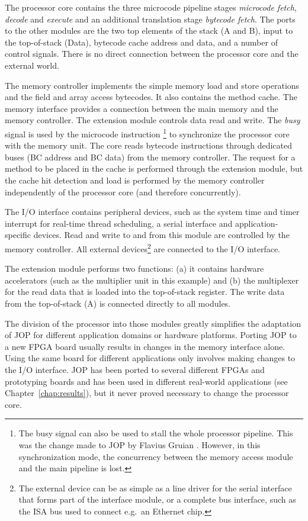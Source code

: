 The processor core contains the three microcode pipeline stages
\emph{microcode fetch}, \emph{decode} and \emph{execute} and an
additional translation stage \emph{bytecode fetch}. The ports to the
other modules are the two top elements of the stack (A and B), input
to the top-of-stack (Data), bytecode cache address and data, and a
number of control signals. There is no direct connection between the
processor core and the external world.

The memory controller implements the simple memory load and store
operations and the field and array access bytecodes. It also contains
the method cache. The memory interface provides a connection between
the main memory and the memory controller. The extension module
controls data read and write. The \emph{busy} signal is used by the
microcode instruction \footnote{The busy signal can also
be used to stall the whole processor pipeline. This was the change
made to JOP by Flavius Gruian \cite{jop:sac05}. However, in this
synchronization mode, the concurrency between the memory access
module and the main pipeline is lost.} to synchronize the processor
core with the memory unit. The core reads bytecode instructions
through dedicated buses (BC address and BC data) from the memory
controller. The request for a method to be placed in the cache is
performed through the extension module, but the cache hit detection
and load is performed by the memory controller independently of the
processor core (and therefore concurrently).

The I/O interface contains peripheral devices, such as the system
time and timer interrupt for real-time thread scheduling, a serial
interface and application-specific devices. Read and write to and
from this module are controlled by the memory controller. All
external devices\footnote{The external device can be as simple as a
line driver for the serial interface that forms part of the interface
module, or a complete bus interface, such as the ISA bus used to
connect e.g.\ an Ethernet chip.} are connected to the I/O interface.

The extension module performs two functions: (a) it contains hardware
accelerators (such as the multiplier unit in this example) and (b)
the multiplexer for the read data that is loaded into the
top-of-stack register. The write data from the top-of-stack (A) is
connected directly to all modules.

The division of the processor into those modules greatly simplifies
the adaptation of JOP for different application domains or hardware
platforms. Porting JOP to a new FPGA board usually results in changes
in the memory interface alone. Using the same board for different
applications only involves making changes to the I/O interface. JOP
has been ported to several different FPGAs and prototyping boards and
has been used in different real-world applications (see
Chapter~\ref{chap:results}), but it never proved necessary to change
the processor core.

